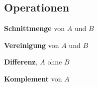 \subsection{Operationen}

\begin{description}[style=nextline]
	\item[\(A \cap B\)]
	      \textbf{Schnittmenge} von \(A\) und \(B\)
	\item[\(A \cup B\)]
	      \textbf{Vereinigung} von \(A\) und \(B\)
	\item[\(A \setminus B\)]
	      \textbf{Differenz}, \(A\) ohne \(B\)
	\item[\(\bar{A}\)]
	      \textbf{Komplement} von \(A\)
\end{description}
